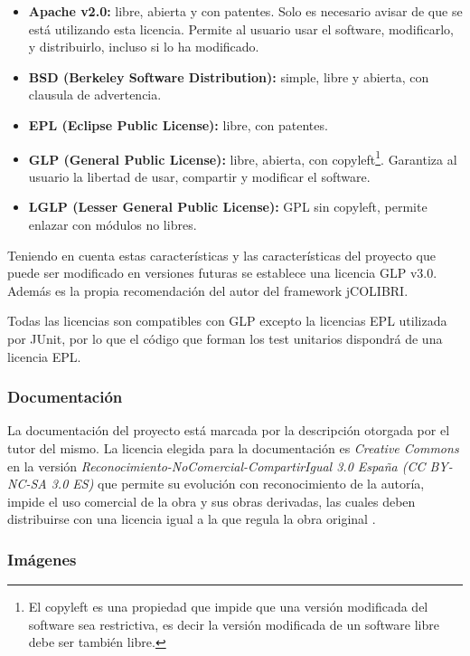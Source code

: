 \begin{itemize}
\tightlist
\item
\textbf{Apache v2.0:} libre, abierta y con patentes. Solo es necesario avisar de que se está utilizando esta licencia. Permite al usuario usar el software, modificarlo, y distribuirlo, incluso si lo ha modificado.
\item
\textbf{BSD (Berkeley Software Distribution):} simple, libre y abierta, con clausula de advertencia.
\item
\textbf{EPL (Eclipse Public License):} libre, con patentes.
\item
\textbf{GLP (General Public License):} libre, abierta, con copyleft\footnote{El copyleft es una propiedad que impide que una versión modificada del software sea restrictiva, es decir la versión modificada de un software libre debe ser también libre.}. Garantiza al usuario la libertad de usar, compartir y modificar el software.
\item
\textbf{LGLP (Lesser General Public License):} GPL sin copyleft, permite enlazar con módulos no libres.
\end{itemize}

Teniendo en cuenta estas características y las características del proyecto que puede ser modificado en versiones futuras se establece una licencia GLP v3.0. Además es la propia recomendación del autor del framework jCOLIBRI.

Todas las licencias son compatibles con GLP \cite{lic:compgnu} excepto la licencias EPL utilizada por JUnit, por lo que el código que forman los test unitarios dispondrá de una licencia EPL.

\subsubsection{Documentación}

La documentación del proyecto está marcada por la descripción otorgada por el tutor del mismo. La licencia elegida para la documentación es \emph{Creative Commons} en la versión \emph{Reconocimiento-NoComercial-CompartirIgual 3.0 España (CC BY-NC-SA 3.0 ES)} que permite su evolución con reconocimiento de la autoría, impide el uso comercial de la obra y sus obras derivadas, las cuales deben distribuirse con una licencia igual a la que regula la obra original \cite{cc:ncsa}.

\subsubsection{Imágenes}

